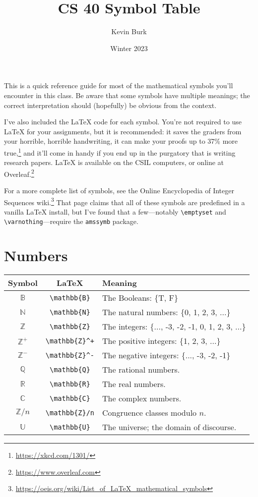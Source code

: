 \documentclass{article}
\title{CS 40 Symbol Table}
\author{Kevin Burk}
\date{Winter 2023}
\begin{document}
\maketitle

This is a quick reference guide for most of the mathematical symbols you'll encounter in this class.
Be aware that some symbols have multiple meanings; the correct interpretation should (hopefully) be obvious from the context.

I've also included the \LaTeX{} code for each symbol.
You're not required to use \LaTeX{} for your assignments, but it is recommended: it saves the graders from your horrible, horrible handwriting, it can make your proofs up to 37\% more true,\footnote{\url{https://xkcd.com/1301/}} and it'll come in handy if you end up in the purgatory that is writing research papers.
\LaTeX{} is available on the CSIL computers, or online at Overleaf.\footnote{\url{https://www.overleaf.com}}

For a more complete list of symbols, see the Online Encyclopedia of Integer Sequences wiki.\footnote{\url{https://oeis.org/wiki/List_of_LaTeX_mathematical_symbols}}
That page claims that all of these symbols are predefined in a vanilla \LaTeX{} install, but I've found that a few---notably \texttt{{\textbackslash}emptyset} and \texttt{{\textbackslash}varnothing}---require the \texttt{amssymb} package.


\section{Numbers}

\renewcommand{\arraystretch}{1.2}
\begin{tabularx}{\textwidth}{ccX}
    Symbol & \LaTeX & Meaning \\
    \hline
    $\mathbb{B}$ & \texttt{{\textbackslash}mathbb\{B\}} & The Booleans: \{T, F\} \\
    $\mathbb{N}$ & \texttt{{\textbackslash}mathbb\{N\}} & The natural numbers: \{0, 1, 2, 3, ...\} \\
    $\mathbb{Z}$ & \texttt{{\textbackslash}mathbb\{Z\}} & The integers: \{..., -3, -2, -1, 0, 1, 2, 3, ...\} \\
    $\mathbb{Z}^+$ & \texttt{{\textbackslash}mathbb\{Z\}\textasciicircum+} & The positive integers: \{1, 2, 3, ...\} \\
    $\mathbb{Z}^-$ & \texttt{{\textbackslash}mathbb\{Z\}\textasciicircum-} & The negative integers: \{..., -3, -2, -1\} \\
    $\mathbb{Q}$ & \texttt{{\textbackslash}mathbb\{Q\}} & The rational numbers. \\
    $\mathbb{R}$ & \texttt{{\textbackslash}mathbb\{R\}} & The real numbers. \\
    $\mathbb{C}$ & \texttt{{\textbackslash}mathbb\{C\}} & The complex numbers. \\
    $\mathbb{Z}/n$ & \texttt{{\textbackslash}mathbb\{Z\}/n} & Congruence classes modulo $n$. \\
    $\mathbb{U}$ & \texttt{{\textbackslash}mathbb\{U\}} & The universe; the domain of discourse.
\end{tabularx}
\vspace{1em}
\end{document}
